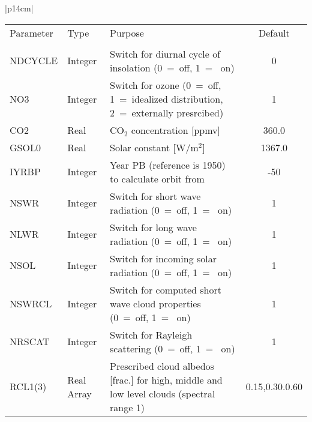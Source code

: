 \begin{center}
\begin{tabular}{|p{14cm}|}
\begin{center}
\begin{tabular}{l l p{5cm} c}  %
Parameter & Type & Purpose & Default \\
&&&\\
NDCYCLE & Integer & Switch for diurnal cycle of insolation (0~=~off, 1~=~ on) & 0 \\
NO3 & Integer &Switch for ozone (0~=~off, 1~=~idealized distribution, 2~=~externally
presrcibed) & 1 \\
CO2 & Real & CO$_2$ concentration [ppmv] & 360.0 \\
GSOL0 & Real & Solar constant [W/m$^2$] & 1367.0 \\
IYRBP & Integer & Year PB (reference is 1950) to calculate orbit from & -50 \\
NSWR& Integer & Switch for short wave radiation (0~=~off, 1~=~ on)  & 1 \\
NLWR& Integer & Switch for long wave radiation (0~=~off, 1~=~ on)  & 1 \\
NSOL& Integer & Switch for incoming solar radiation (0~=~off, 1~=~ on)  & 1 \\
NSWRCL& Integer & Switch for computed short wave cloud properties (0~=~off, 1~=~ on) 
& 1 \\
NRSCAT&  Integer & Switch for Rayleigh scattering (0~=~off, 1~=~ on)  & 1 \\
RCL1(3) & Real Array & Prescribed cloud albedos [frac.] for high, middle and low level
clouds
(spectral range 1)& 0.15,0.30.0.60 \\
\end{tabular}
\end{center}
\end{tabular}
\end{center}

\newpage 

